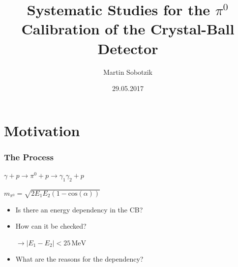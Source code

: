 \documentclass[slidestop,compress,mathserif]{beamer}
\title{Systematic Studies for the $\pi^0$ Calibration of the Crystal-Ball Detector}
\author{Martin Sobotzik}
\institute{Johannes Gutenberg-Universit\"at Mainz}
\date{29.05.2017}
\begin{document}
 

\begin{frame} 
\titlepage 
\end{frame} 


\section{Motivation}
\begin{frame}

		\frametitle{The Process}
	
		\begin{center}
		$	\gamma + p \rightarrow \pi^0 +p \rightarrow \gamma_1 \gamma_2 + p$
		\end{center}
		\begin{center}
		$m_{\pi^0}=\sqrt{2 E_1E_2(1-\text{cos}(\alpha))}$
		\end{center}
		\pause
			\begin{itemize}
				\item Is there an energy dependency in the CB?
				\pause
		\item How can it be checked?
		\pause
		 
		 
		 $\rightarrow |E_1 - E_2|<25\,\text{MeV}$
		\pause

		\item What are the reasons for the dependency?
	\end{itemize}
\end{frame}
\end{document}
